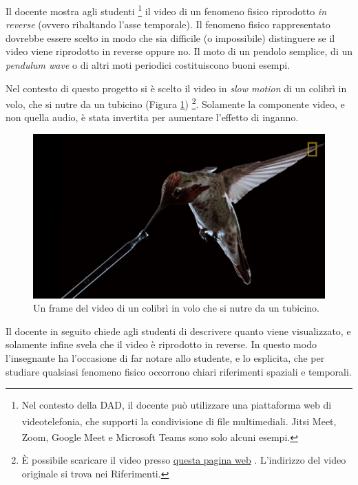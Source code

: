 \documentclass{report} \usepackage[T1]{fontenc} \usepackage[italian]{babel}
\begin{document}
Il docente mostra agli studenti
\footnote{
Nel contesto della DAD, il docente può utilizzare
una piattaforma web di videotelefonia, che supporti la condivisione
di file multimediali. Jitsi Meet\textsuperscript{\textregistered},
Zoom\textsuperscript{\textregistered},
Google Meet\textsuperscript{\textregistered} e
Microsoft Teams\textsuperscript{\textregistered}
sono solo alcuni esempi.
}
il video di un fenomeno fisico riprodotto \emph{in reverse} (ovvero ribaltando
l'asse temporale). Il fenomeno fisico rappresentato dovrebbe essere scelto
in modo che sia difficile (o impossibile) distinguere se il video viene
riprodotto in reverse oppure no. Il moto di un pendolo semplice,
di un \emph{pendulum wave} o di altri moti periodici costituiscono buoni
esempi.

Nel contesto di questo progetto si è scelto il video in \emph{slow motion}
di un colibrì in volo, che si nutre da un tubicino (Figura \ref{fig:hummingbird})
\footnote{
\`E possibile scaricare il video presso
\href{https://github.com/savaroskij/PED1/blob/master/progetto_finale/media/video/Hummingbird.mp4?raw=true}{questa pagina web}
. L'indirizzo del video originale si trova nei Riferimenti\cite{hbird}.
}.
Solamente la componente video, e non quella audio, è stata invertita per
aumentare l'effetto di inganno.
\begin{figure}
\centering
  \includegraphics[width=\textwidth]{Hummingbird}
  \caption{Un frame del video di un colibrì in volo che si nutre da un tubicino.}
  \label{fig:hummingbird}
\end{figure}
Il docente in seguito chiede agli studenti di descrivere quanto viene
visualizzato, e solamente infine svela che il video è riprodotto in
reverse. In questo modo l'insegnante ha l'occasione di far notare
allo studente, e lo esplicita, che per studiare qualsiasi fenomeno fisico
occorrono chiari riferimenti spaziali e temporali.
\end{document}
